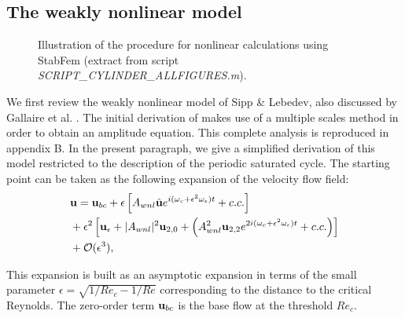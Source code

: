 \documentclass[twocolumn,10pt]{asme2ej}
\newcommand{\be}[1]{ \begin{equation} \label{#1}}
\newcommand{\ee}{\end{equation}}
\begin{document}



\subsection{The weakly nonlinear model}



\begin{figure*}
\small

 \normalsize
\caption{Illustration of the procedure for nonlinear calculations using StabFem (extract from script {{\em SCRIPT\_CYLINDER\_ALLFIGURES.m})}. }
\label{fig:listingNL}
\end{figure*}



We first review the weakly nonlinear model of Sipp \& 
Lebedev\cite{SippLebedev}, also discussed by Gallaire et al. \cite{FDR2016}.  
The initial derivation of \cite{SippLebedev} makes use of a multiple scales method in order to obtain an amplitude equation.
This complete analysis is reproduced in appendix B. In the present paragraph, we give a simplified derivation of this model restricted to the description of the periodic saturated cycle.
The starting point can be taken as the following expansion of the velocity flow field:
\be{WNL1}
\begin{aligned}
&{\bf u} = {}  {\bf u}_{bc} + \epsilon \left[ A_{wnl}  \hat{\bf u} e^{i (\omega_c+\epsilon^2 \omega_\epsilon)  t} + c.c. \right]\\
&+ \epsilon^2 \left[ {\bf u}_\epsilon + |A_{wnl}|^2  {\bf u}_{2,0} + \left(  A_{wnl}^2 {\bf u}_{2,2} e^{2 i(\omega_c+\epsilon^2 \omega_\epsilon)  t} + c.c. \right) \right]\\
& + {\cal O}( \epsilon ^3),
\end{aligned}
\ee



This expansion is built as an asymptotic expansion in terms of the small parameter $\epsilon = \sqrt{1/Re_c - 1/Re}$ corresponding to the distance to the critical Reynolds. 
The zero-order term ${\bf u}_{bc}$ is the base flow at the threshold $Re_c$.
\end{document}
